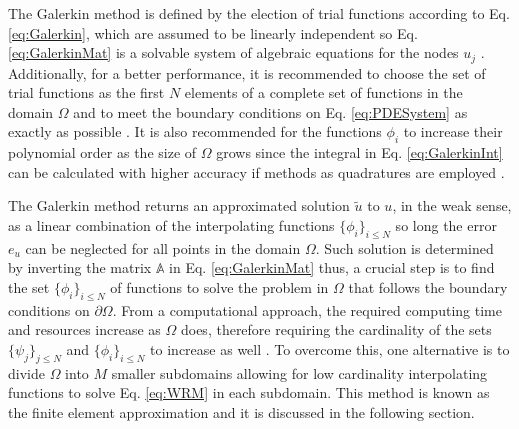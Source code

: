     The Galerkin method is defined by the election of trial functions according to Eq. \eqref{eq:Galerkin}, which are assumed to be linearly independent so Eq. \eqref{eq:GalerkinMat} is a solvable system of algebraic equations for the nodes $u_j$ \cite{fletcher_computational_1984}. Additionally, for a  better performance, it is recommended to choose the set of trial functions as the first $N$ elements of a complete set of functions in the domain $\Omega$ and to meet the boundary conditions on Eq. \eqref{eq:PDESystem} as exactly as possible \cite{fletcher_computational_1984}. It is also recommended for the functions $\phi_i$ to increase their polynomial order as the size of $\Omega$ grows since the integral in   Eq. \eqref{eq:GalerkinInt} can be calculated with higher accuracy if methods as quadratures are employed \cite{fletcher_computational_1984}.

    The Galerkin method returns an approximated solution $\tilde{u}$ to $u$, in the weak sense, as a linear combination of the interpolating functions $\{\phi_i\}_{i\leq N}$ so long the error $e_{u}$ can be neglected for all points in the domain $\Omega$.  Such solution is determined by inverting the matrix $\mathbb{A}$ in Eq. \eqref{eq:GalerkinMat} thus, a crucial step is to find the set $\{\phi_i\}_{i\leq N}$ of functions to solve the problem in $\Omega$ that follows the boundary conditions on $\partial\Omega$.  From a computational approach, the required computing time and resources increase as $\Omega$ does, therefore requiring the cardinality of the sets $\{\psi_j\}_{j\leq N}$ and  $\{\phi_i\}_{i\leq N}$ to increase as well \cite{dhatt_finite_2012}. To overcome this, one alternative is to divide $\Omega$ into $M$ smaller subdomains allowing for low cardinality interpolating functions to solve Eq. \eqref{eq:WRM}  in each subdomain.  This method is known as the finite element approximation and it is discussed in the following section.
